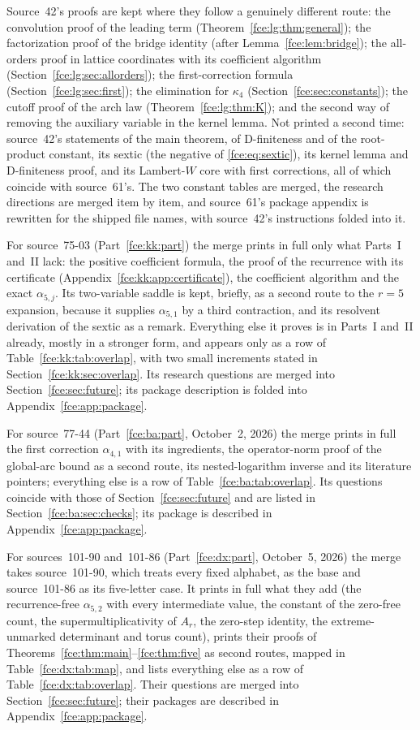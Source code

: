 \documentclass[11pt,a4paper]{article}
\numberwithin{equation}{section}
\theoremstyle{definition}\newtheorem{definition}[theorem]{Definition}
\theoremstyle{remark}\newtheorem{remark}[theorem]{Remark}
\begin{document}
Source~42's proofs are kept where they follow a genuinely different route:
the convolution proof of the leading term
(Theorem~\ref{fce:lg:thm:general}); the factorization proof of the bridge
identity (after Lemma~\ref{fce:lem:bridge}); the all-orders proof in lattice
coordinates with its coefficient algorithm
(Section~\ref{fce:lg:sec:allorders}); the first-correction formula
(Section~\ref{fce:lg:sec:first}); the elimination for $\kappa_4$
(Section~\ref{fce:sec:constants}); the cutoff proof of the arch law
(Theorem~\ref{fce:lg:thm:K}); and the second way of removing the auxiliary
variable in the kernel lemma. Not printed a second time: source~42's
statements of the main theorem, of D-finiteness and of the root-product
constant, its sextic (the negative of \eqref{fce:eq:sextic}), its kernel
lemma and D-finiteness proof, and its Lambert-$W$ core with first
corrections, all of which coincide with source~61's. The two constant
tables are merged, the research directions are merged item by item, and
source~61's package appendix is rewritten for the shipped file names, with
source~42's instructions folded into it.

For source~75-03 (Part~\ref{fce:kk:part}) the merge prints in full only
what Parts~I and~II lack: the positive coefficient formula, the proof of
the recurrence with its certificate (Appendix~\ref{fce:kk:app:certificate}),
the coefficient algorithm and the exact $\alpha_{5,j}$. Its two-variable
saddle is kept, briefly, as a second route to the $r=5$ expansion, because
it supplies $\alpha_{5,1}$ by a third contraction, and its resolvent
derivation of the sextic as a remark. Everything else it proves is in
Parts~I and~II already, mostly in a stronger form, and appears only as a
row of Table~\ref{fce:kk:tab:overlap}, with two small increments stated in
Section~\ref{fce:kk:sec:overlap}. Its research questions are merged into
Section~\ref{fce:sec:future}; its package description is folded into
Appendix~\ref{fce:app:package}.

For source~77-44 (Part~\ref{fce:ba:part}, October~2, 2026) the merge prints
in full the first correction $\alpha_{4,1}$ with its ingredients, the
operator-norm proof of the global-arc bound as a second route, its
nested-logarithm inverse and its literature pointers; everything else is a
row of Table~\ref{fce:ba:tab:overlap}. Its questions coincide with those of
Section~\ref{fce:sec:future} and are listed in
Section~\ref{fce:ba:sec:checks}; its package is described in
Appendix~\ref{fce:app:package}.

For sources~101-90 and~101-86 (Part~\ref{fce:dx:part}, October~5, 2026) the
merge takes source~101-90, which treats every fixed alphabet, as the base and
source~101-86 as its five-letter case. It prints in full what they add (the
recurrence-free $\alpha_{5,2}$ with every intermediate value, the constant of
the zero-free count, the supermultiplicativity of $A_r$, the zero-step
identity, the extreme-unmarked determinant and torus count), prints their
proofs of Theorems~\ref{fce:thm:main}--\ref{fce:thm:five} as second routes,
mapped in Table~\ref{fce:dx:tab:map}, and lists everything else as a row of
Table~\ref{fce:dx:tab:overlap}. Their questions are merged into
Section~\ref{fce:sec:future}; their packages are described in
Appendix~\ref{fce:app:package}.
\end{document}
